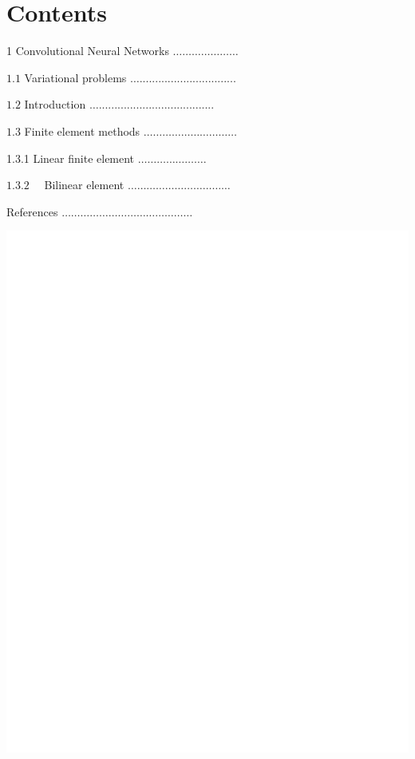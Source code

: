 \documentclass[10pt]{article}
\begin{document}
\section{Contents}
1 Convolutional Neural Networks $\ldots \ldots \ldots \ldots \ldots \ldots \ldots$

$1.1$ Variational problems $\ldots . . . . . . . . . . . . . . . . . . . . . . . . . . . . . . .$

$1.2$ Introduction $\ldots . . . . . . . . . . . . . . . . . . . . . . . . . . . . . . . . . . . . .$

$1.3$ Finite element methods $\ldots \ldots \ldots \ldots \ldots \ldots \ldots \ldots \ldots \ldots$

1.3.1 Linear finite element $\ldots \ldots \ldots \ldots \ldots \ldots \ldots .$

$1.3 .2 \quad$ Bilinear element $\ldots \ldots \ldots \ldots \ldots \ldots \ldots \ldots \ldots \ldots \ldots$

References $\ldots \ldots \ldots \ldots \ldots \ldots \ldots \ldots \ldots \ldots \ldots \ldots \ldots \ldots$

\includegraphics[max width=\textwidth]{2022_01_06_c2f144dbff0f0a17cc7dg-2}
\end{document}
